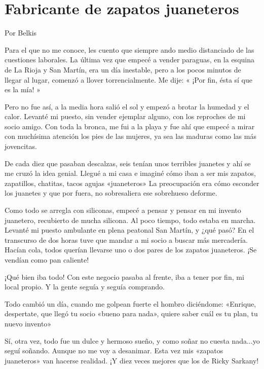 \documentclass[11pt,twoside,openright,a5paper]{book}
\begin{document}
\section*{Fabricante de zapatos juaneteros}

                                                             \begin{flushright}Por Belkis\end{flushright}

Para el que no me conoce, les cuento que siempre ando medio distanciado de las cuestiones laborales. La última vez que empecé a vender paraguas, en la esquina de La Rioja y San Martín, era un día inestable, pero a los pocos minutos de llegar al lugar, comenzó a llover torrencialmente. Me dije: « ¡Por fin, ésta sí que es la mía! »

Pero no fue así, a la media hora salió el sol y empezó a brotar la humedad y el calor. Levanté mi puesto, sin vender ejemplar alguno, con los reproches de mi socio amigo. Con toda la bronca, me fui a la playa y fue ahí que empecé a mirar con muchísima atención los pies de las mujeres, ya sea las maduras como las más jovencitas.

De cada diez que pasaban descalzas, seis tenían unos terribles juanetes y ahí se me cruzó la idea genial. Llegué a mi casa e imaginé cómo iban a ser mis zapatos, zapatillos, chatitas, tacos agujas «juaneteros» La preocupación era cómo esconder los juanetes y que por fuera, no sobresaliera ese sobrehueso deforme. 

Como todo se arregla con siliconas, empecé a pensar y pensar en mi invento juanetero, recubierto de mucha silicona. Al poco tiempo, todo estaba en marcha. Levanté mi puesto ambulante en plena peatonal San Martín, y ¿qué pasó? En el transcurso de dos horas tuve que mandar a mi socio a buscar más mercadería. Hacían cola, todos querían llevarse uno o dos pares de los zapatos juaneteros. ¡Se vendían como pan caliente!

¡Qué bien iba todo! Con este negocio pasaba al frente, iba a tener por fin, mi local propio. Y la gente seguía y seguía comprando.

Todo cambió un día, cuando me golpean fuerte el hombro diciéndome: «Enrique, despertate, que llegó tu socio «bueno para nada», quiere saber cuál es tu plan, tu nuevo invento»

Sí, otra vez,  todo fue un dulce y hermoso sueño, y como soñar no cuesta nada...yo seguí soñando. Aunque no me voy a desanimar. Esta vez mis «zapatos juaneteros» van hacerse realidad. ¡Y  diez veces mejores que los de Ricky Sarkany!
\end{document}
